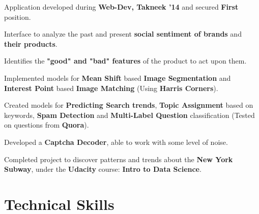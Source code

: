 \documentclass[a4paper]{norm-resume}
\begin{document}
	\vspace{2mm}
	
	   
	\begin{tightitemize}
	\small
	{
	\item Application developed during \textbf{Web-Dev, Takneek '14} and secured \textbf{First} position.
	\item Interface to analyze the past and present \textbf{social sentiment of brands} and \textbf{their products}.
	\item Identifies the \textbf{"good" and "bad" features} of the product to act upon them.
	}
	\end{tightitemize}
 		
	\vspace{2mm}
	
			\descript{\null}
	\begin{tightitemize}
	\small
	{
	\item Implemented models for \textbf{Mean Shift} based \textbf{Image Segmentation} and \textbf{Interest Point} based \textbf{Image Matching} (Using \textbf{Harris Corners}).
	\item Created models for \textbf{Predicting Search trends}, \textbf{Topic Assignment} based on keywords, \textbf{Spam Detection} and \textbf{Multi-Label Question} classification (Tested on questions from \textbf{Quora}).
	\item Developed a \textbf{Captcha Decoder}, able to work with some level of noise.
	\item Completed project to discover patterns and trends about the \textbf{New York Subway}, under the \textbf{Udacity} course: \textbf{Intro to Data Science}.
	}
	\end{tightitemize}		

\vspace{1mm}	%


\section{Technical Skills}

\vspace{1mm}	%

 \hfill {} \\
\vspace{1mm}	%
 \hfill {} \\
\vspace{1mm}	%
 \hfill {}
\end{document}
